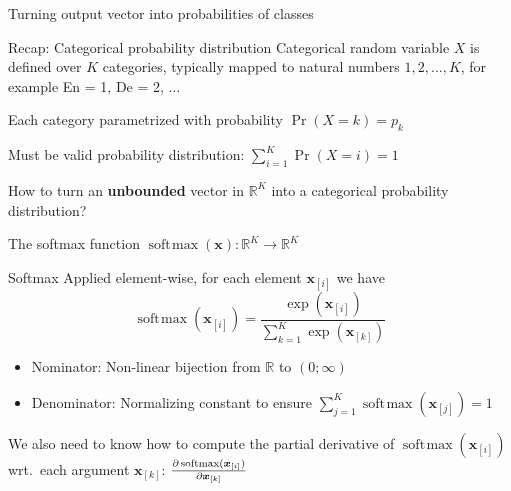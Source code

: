 \documentclass[12pt,aspectratio=169,handout]{beamer}
\DeclareMathOperator*{\softmax}{soft\!\max}
\begin{document}
\begin{frame}{Turning output vector into probabilities of classes}
	
	\begin{block}{Recap: Categorical probability distribution}
		Categorical random variable $X$ is defined over $K$ categories, typically mapped to natural numbers $1, 2, \ldots, K$, for example En = 1, De = 2, $\ldots$
		
		\pause
		Each category parametrized with probability $\Pr(X = k) = p_k$
		
		\pause
		Must be valid probability distribution: $\sum_{i =1}^{K} \Pr(X = i) = 1$
	\end{block}
	
	\pause
	How to turn an \textbf{unbounded} vector in $\mathbb{R}^K$ into a categorical probability distribution?
	
\end{frame}

\begin{frame}{The softmax function $\softmax (\bm{x}): \mathbb{R}^K \to \mathbb{R}^K$}
	
	\begin{block}{Softmax}
		Applied element-wise, for each element $\bm{x}_{[i]}$ we have
		$$
		\softmax (\bm{x}_{[i]}) = \frac{\exp(\bm{x}_{[i]})}{
			\sum_{k=1}^{K} \exp(\bm{x}_{[k]})
		}
		$$
	\end{block}
	
	\pause
	\begin{itemize}
		\item Nominator: Non-linear bijection from $\mathbb{R}$ to $(0; \infty)$
		\item Denominator: Normalizing constant to ensure $\sum_{j = 1}^{K} \softmax (\bm{x}_{[j]}) = 1$
	\end{itemize}
	
	\pause
	We also need to know how to compute the partial derivative of $\softmax (\bm{x}_{[i]})$ wrt.\ each argument $\bm{x}_{[k]}$: $\pdv{\softmax (\bm{x}_{[i]})}{\bm{x}_{[k]}}$
	
\end{frame}
\end{document}
